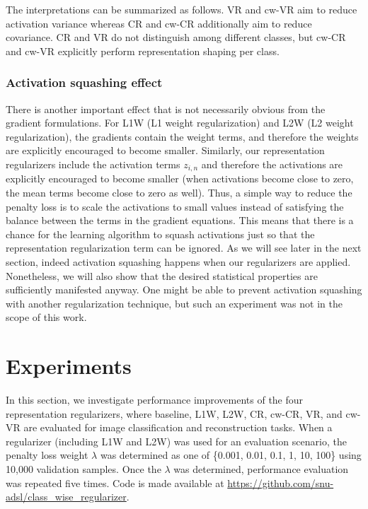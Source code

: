 \documentclass[letterpaper]{article} %
\begin{document}
The interpretations can be summarized as follows. VR and cw-VR aim to reduce activation variance whereas CR and cw-CR additionally aim to reduce covariance. CR and VR do not distinguish among different classes, but cw-CR and cw-VR explicitly perform representation shaping per class.

\subsubsection{Activation squashing effect}
There is another important effect that is not necessarily obvious from the gradient formulations.
For L1W (L1 weight regularization) and L2W (L2 weight regularization), the gradients contain the weight terms, and therefore the weights are explicitly encouraged to become smaller. Similarly, our representation regularizers include the activation terms $z_{i,n}$ and therefore the activations are explicitly encouraged to become smaller (when activations become close to zero, the mean terms become close to zero as well). Thus, a simple way to reduce the penalty loss is to scale the activations to small values instead of satisfying the balance between the terms in the gradient equations. 
This means that there is a chance for the learning algorithm to squash activations just so that the representation regularization term can be ignored. As we will see later in the next section, indeed activation squashing happens when our regularizers are applied. Nonetheless, we will also show that the desired statistical properties are sufficiently manifested anyway. One might be able to prevent activation squashing with another regularization technique, but such an experiment was not in the scope of this work. 



\section{Experiments}
\label{sec:experiments}
In this section, we investigate performance improvements of the four representation regularizers, where baseline, L1W, L2W, CR, cw-CR, VR, and cw-VR are evaluated for image classification and reconstruction tasks. When a regularizer (including L1W and L2W) was used for an evaluation scenario, the penalty loss weight $\lambda$ was determined as one of \{0.001, 0.01, 0.1, 1, 10, 100\} using 10,000 validation samples. Once the $\lambda$ was determined, performance evaluation was repeated five times. Code is made available at
\url{https://github.com/snu-adsl/class_wise_regularizer}.
\end{document}
